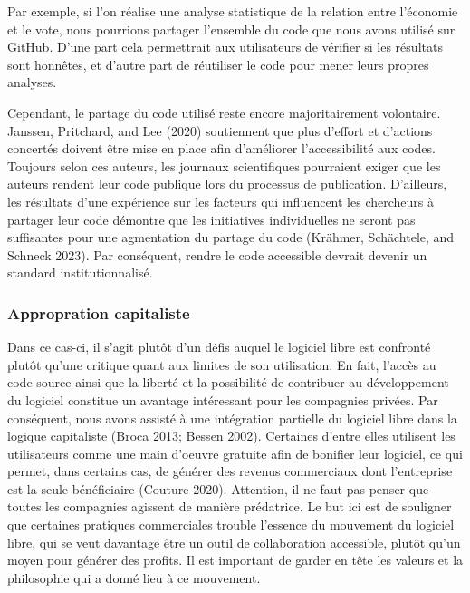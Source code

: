 \documentclass[
  letterpaper,
]{scrbook}
\begin{document}
Par exemple, si l'on réalise une analyse statistique de la relation
entre l'économie et le vote, nous pourrions partager l'ensemble du code
que nous avons utilisé sur GitHub. D'une part cela permettrait aux
utilisateurs de vérifier si les résultats sont honnêtes, et d'autre part
de réutiliser le code pour mener leurs propres analyses.

Cependant, le partage du code utilisé reste encore majoritairement
volontaire. Janssen, Pritchard, and Lee (2020) soutiennent que plus
d'effort et d'actions concertés doivent être mise en place afin
d'améliorer l'accessibilité aux codes. Toujours selon ces auteurs, les
journaux scientifiques pourraient exiger que les auteurs rendent leur
code publique lors du processus de publication. D'ailleurs, les
résultats d'une expérience sur les facteurs qui influencent les
chercheurs à partager leur code démontre que les initiatives
individuelles ne seront pas suffisantes pour une agmentation du partage
du code (Krähmer, Schächtele, and Schneck 2023). Par conséquent, rendre
le code accessible devrait devenir un standard institutionnalisé.

\hypertarget{appropration-capitaliste}{%
\subsubsection{Appropration
capitaliste}\label{appropration-capitaliste}}

Dans ce cas-ci, il s'agit plutôt d'un défis auquel le logiciel libre est
confronté plutôt qu'une critique quant aux limites de son utilisation.
En fait, l'accès au code source ainsi que la liberté et la possibilité
de contribuer au développement du logiciel constitue un avantage
intéressant pour les compagnies privées. Par conséquent, nous avons
assisté à une intégration partielle du logiciel libre dans la logique
capitaliste (Broca 2013; Bessen 2002). Certaines d'entre elles utilisent
les utilisateurs comme une main d'oeuvre gratuite afin de bonifier leur
logiciel, ce qui permet, dans certains cas, de générer des revenus
commerciaux dont l'entreprise est la seule bénéficiaire (Couture 2020).
Attention, il ne faut pas penser que toutes les compagnies agissent de
manière prédatrice. Le but ici est de souligner que certaines pratiques
commerciales trouble l'essence du mouvement du logiciel libre, qui se
veut davantage être un outil de collaboration accessible, plutôt qu'un
moyen pour générer des profits. Il est important de garder en tête les
valeurs et la philosophie qui a donné lieu à ce mouvement.
\end{document}
